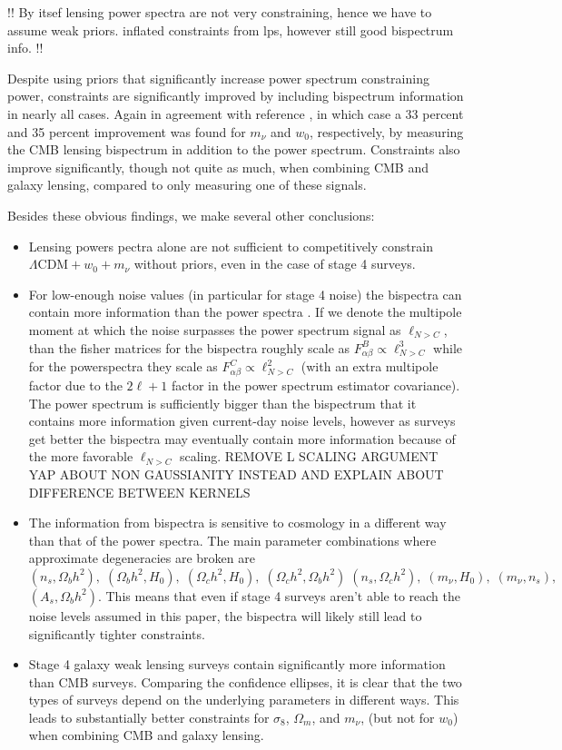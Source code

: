 \documentclass[11pt]{article} %
\begin{document}
!!
By itsef lensing power spectra are not very constraining, hence we have to assume weak priors. inflated constraints from lps, however still good bispectrum info. 
!!


Despite using priors that significantly increase power spectrum constraining power, constraints are significantly improved by including bispectrum information in nearly all cases. Again in agreement with reference \cite{Namikawa_2016}, in which case a 33 percent and 35 percent improvement was found for $m_\nu$ and $w_0$, respectively, by measuring the CMB lensing bispectrum in addition to the power spectrum. Constraints also improve significantly, though not quite as much, when combining CMB and galaxy lensing, compared to only measuring one of these signals. 

Besides these obvious findings, we make several other conclusions:
\begin{itemize}
    \item Lensing powers pectra alone are not sufficient to competitively constrain $\Lambda\mathrm{CDM} + w_0 + m_\nu$ without priors, even in the case of stage 4 surveys.
    \item For low-enough noise values (in particular for stage 4 noise) the bispectra can contain more information than the power spectra . If we denote the multipole moment at which the noise surpasses the power spectrum signal as $\ell_{N>C}$, than the fisher matrices for the bispectra roughly scale as $F^{B}_{\alpha\beta}\propto \ell_{N>C}^3$ while for the powerspectra they scale as $F^{C}_{\alpha\beta}\propto \ell_{N>C}^2$ (with an extra multipole factor due to the $2\ell + 1$ factor in the power spectrum estimator covariance). The power spectrum is sufficiently bigger than the bispectrum that it contains more information given current-day noise levels, however as surveys get better the bispectra may eventually contain more information because of the more favorable $\ell_{N>C}$ scaling. REMOVE L SCALING ARGUMENT YAP ABOUT NON GAUSSIANITY INSTEAD AND EXPLAIN ABOUT DIFFERENCE BETWEEN KERNELS

    \item The information from bispectra is sensitive to cosmology in a different way than that of the power spectra. The main parameter combinations where approximate degeneracies are broken are $(n_s,\Omega_b h^2),\;(\Omega_b h^2,H_0),\;(\Omega_c h^2,H_0),\;(\Omega_c h^2,\Omega_b h^2)\;(n_s,\Omega_c h^2),\;(m_\nu,H_0),\;(m_\nu,n_s),$ $(A_s,\Omega_b h^2)$. This means that even if stage 4 surveys aren't able to reach the noise levels assumed in this paper, the bispectra will likely still lead to significantly tighter constraints.

    \item Stage 4 galaxy weak lensing surveys contain significantly more information than CMB surveys. Comparing the confidence ellipses, it is clear that the two types of surveys depend on the underlying parameters in different ways. This leads to substantially better constraints for $\sigma_8$, $\Omega_m$, and $m_\nu$, (but not for $w_0$) when combining CMB and galaxy lensing.
\end{itemize}
\end{document}
